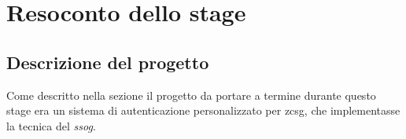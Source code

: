 
\chapter{Resoconto dello stage}
\label{cap:resoconto}

\section{Descrizione del progetto}
Come descritto nella sezione  il progetto da portare a termine durante questo stage era un sistema di autenticazione personalizzato per \gls{zcsg}, che implementasse la tecnica del \textit{\gls{ssog}}. \\

